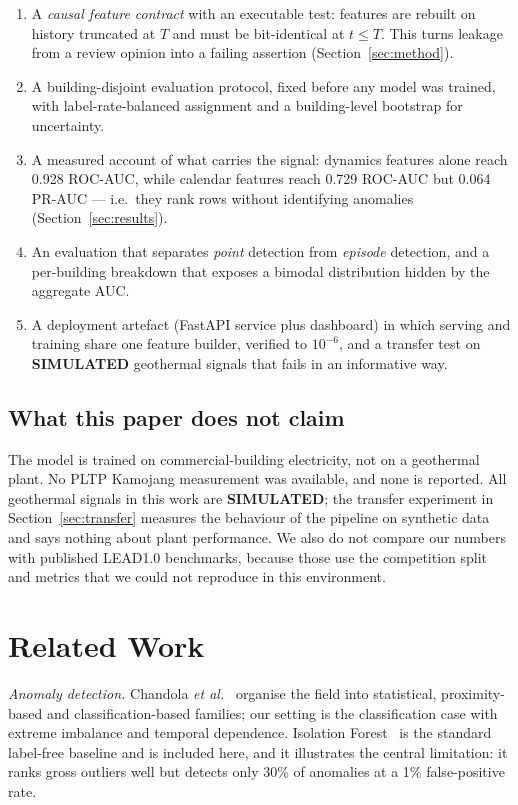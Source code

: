 \documentclass[conference]{IEEEtran}
\newcommand{\simnote}{\textbf{SIMULATED}}
\begin{document}
\begin{enumerate}
\item A \emph{causal feature contract} with an executable test: features are rebuilt on history
truncated at $T$ and must be bit-identical at $t \le T$. This turns leakage from a review opinion into
a failing assertion (Section~\ref{sec:method}).
\item A building-disjoint evaluation protocol, fixed before any model was trained, with
label-rate-balanced assignment and a building-level bootstrap for uncertainty.
\item A measured account of what carries the signal: dynamics features alone reach 0.928 ROC-AUC,
while calendar features reach 0.729 ROC-AUC but 0.064 PR-AUC --- i.e.\ they rank rows without
identifying anomalies (Section~\ref{sec:results}).
\item An evaluation that separates \emph{point} detection from \emph{episode} detection, and a
per-building breakdown that exposes a bimodal distribution hidden by the aggregate AUC.
\item A deployment artefact (FastAPI service plus dashboard) in which serving and training share one
feature builder, verified to $10^{-6}$, and a transfer test on \simnote{} geothermal signals that
fails in an informative way.
\end{enumerate}

\subsection*{What this paper does not claim}

The model is trained on commercial-building electricity, not on a geothermal plant. No PLTP Kamojang
measurement was available, and none is reported. All geothermal signals in this work are
\simnote{}; the transfer experiment in Section~\ref{sec:transfer} measures the behaviour of the
pipeline on synthetic data and says nothing about plant performance. We also do not compare our
numbers with published LEAD1.0 benchmarks, because those use the competition split and metrics that
we could not reproduce in this environment.

\section{Related Work}

\emph{Anomaly detection.} Chandola \emph{et al.}~\cite{chandola2009} organise the field into
statistical, proximity-based and classification-based families; our setting is the classification case
with extreme imbalance and temporal dependence. Isolation Forest~\cite{liu2008} is the standard
label-free baseline and is included here, and it illustrates the central limitation: it ranks gross
outliers well but detects only 30\% of anomalies at a 1\% false-positive rate.
\end{document}
